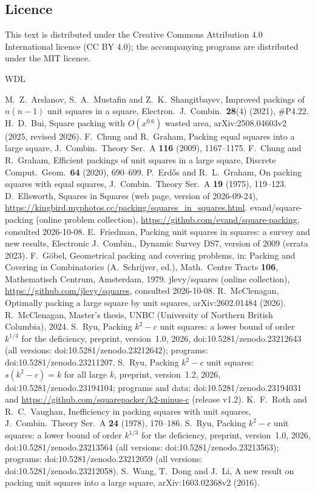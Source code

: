 \documentclass[11pt]{amsart}
\theoremstyle{definition}
\theoremstyle{remark}
\numberwithin{equation}{section}
\begin{document}
\subsection*{Licence}
This text is distributed under the Creative Commons Attribution 4.0 International licence (CC BY 4.0); the accompanying
programs are distributed under the MIT licence.

\begin{thebibliography}{WDL}
\raggedright
{} M.~Z.~Arslanov, S.~A.~Mustafin and Z.~K.~Shangitbayev, Improved packings of $n(n-1)$ unit squares in a
square, Electron.\ J.\ Combin.\ \textbf{28}(4) (2021), \#P4.22.
 H.~D.~Bui, Square packing with $O(x^{0.6})$ wasted area, arXiv:2508.04603v2 (2025, revised 2026).
 F.~Chung and R.~Graham, Packing equal squares into a large square, J.\ Combin.\ Theory Ser.~A
\textbf{116} (2009), 1167--1175.
 F.~Chung and R.~Graham, Efficient packings of unit squares in a large square, Discrete Comput.\ Geom.\
\textbf{64} (2020), 690--699.
 P.~Erd\H{o}s and R.~L.~Graham, On packing squares with equal squares, J.\ Combin.\ Theory Ser.~A
\textbf{19} (1975), 119--123.
 D.~Ellsworth, Squares in Squares (web page, version of 2026-09-24),
\url{https://kingbird.myphotos.cc/packing/squares_in_squares.html}.
\bibitem[Ev]{Ev} evand/square-packing (online problem collection), \url{https://github.com/evand/square-packing},
consulted 2026-10-08.
 E.~Friedman, Packing unit squares in squares: a survey and new results, Electronic J.\ Combin.,
Dynamic Survey DS7, version of 2009 (errata 2023).
 F.~G\"obel, Geometrical packing and covering problems, in: Packing and Covering in Combinatorics
(A.~Schrijver, ed.), Math.\ Centre Tracts \textbf{106}, Mathematisch Centrum, Amsterdam, 1979.
\bibitem[Le]{Le} jlevy/squares (online collection), \url{https://github.com/jlevy/squares}, consulted 2026-10-08.
\bibitem[McC]{McC} R.~McClenagan, Optimally packing a large square by unit squares, arXiv:2602.01484 (2026).
\bibitem[McC2]{McC2} R.~McClenagan, Master's thesis, UNBC (University of Northern British Columbia), 2024.
\bibitem[Q]{Q} S.~Ryu, Packing $k^2-c$ unit squares: a lower bound of order $k^{1/4}$ for the deficiency, preprint,
version~1.0, 2026, doi:10.5281/zenodo.23212643 (all versions: doi:10.5281/zenodo.23212642); programs:
doi:10.5281/zenodo.23211207.
 S.~Ryu, Packing $k^2-c$ unit squares: $s(k^2-c)=k$ for all large $k$, preprint, version~1.2, 2026,
doi:10.5281/zenodo.23194104; programs and data: doi:10.5281/zenodo.23194031 and
\url{https://github.com/squarepacker/k2-minus-c} (release v1.2).
\bibitem[RV]{RV} K.~F.~Roth and R.~C.~Vaughan, Inefficiency in packing squares with unit squares, J.\ Combin.\ Theory
Ser.~A \textbf{24} (1978), 170--186.
 S.~Ryu, Packing $k^2-c$ unit squares: a lower bound of order $k^{1/3}$ for the deficiency, preprint,
version~1.0, 2026, doi:10.5281/zenodo.23213564 (all versions: doi:10.5281/zenodo.23213563); programs:
doi:10.5281/zenodo.23212059 (all versions: doi:10.5281/zenodo.23212058).
\bibitem[WDL]{WDL} S.~Wang, T.~Dong and J.~Li, A new result on packing unit squares into a large square,
arXiv:1603.02368v2 (2016).
\end{thebibliography}
\end{document}
